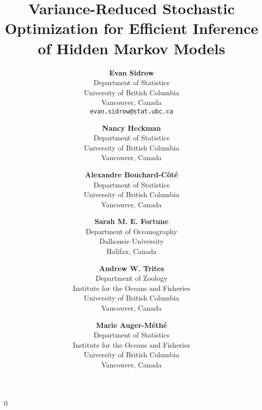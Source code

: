 \documentclass[12pt]{article}
\newcommand{\blind}{0}
\begin{document}
%

\def\spacingset#1{\renewcommand{\baselinestretch}%
{#1}\small\normalsize} \spacingset{1}


\blind
{
    \title{Variance-Reduced Stochastic Optimization for Efficient Inference of Hidden Markov Models}

    \author{
      \textbf{Evan Sidrow} \\
      Department of Statistics \\
      University of British Columbia\\
      Vancouver, Canada \\
      \texttt{evan.sidrow@stat.ubc.ca} \\
      \and
      \textbf{Nancy Heckman} \\
      Department of Statistics \\
      University of British Columbia \\
      Vancouver, Canada \\
      \and
      \textbf{Alexandre Bouchard-C\^ot\'e} \\
      Department of Statistics \\
      University of British Columbia \\
      Vancouver, Canada \\
      \and
      \textbf{Sarah M. E. Fortune} \\
      Department of Oceanography \\
      Dalhousie University \\
      Halifax, Canada \\
      \and
      \textbf{Andrew W. Trites} \\
      Department of Zoology \\
      Institute for the Oceans and Fisheries \\
      University of British Columbia \\
      Vancouver, Canada \\
      \and
      \textbf{Marie Auger-M\'eth\'e} \\
      Department of Statistics \\
      Institute for the Oceans and Fisheries \\
      University of British Columbia \\
      Vancouver, Canada \\
    }
    \maketitle
} \fi
\end{document}
